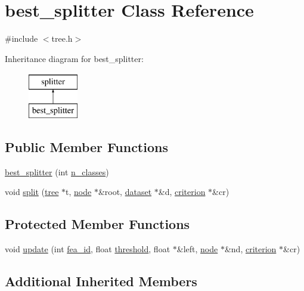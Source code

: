 \hypertarget{classbest__splitter}{\section{best\+\_\+splitter Class Reference}
\label{classbest__splitter}
}


{\ttfamily \#include $<$tree.\+h$>$}

Inheritance diagram for best\+\_\+splitter\+:\begin{figure}[H]
\begin{center}
\leavevmode
\includegraphics[height=2.000000cm]{classbest__splitter}
\end{center}
\end{figure}
\subsection*{Public Member Functions}
\begin{DoxyCompactItemize}
\item 
\hyperlink{classbest__splitter_a40d856f885a1ed21fa840063b8d49164}{best\+\_\+splitter} (int \hyperlink{classsplitter_abfc53538ed65c0afd50aedbf46dff458}{n\+\_\+classes})
\item 
void \hyperlink{classbest__splitter_a1ff1e766bfa4fb6d41c23121d6dd3dbb}{split} (\hyperlink{classtree}{tree} $\ast$t, \hyperlink{classnode}{node} $\ast$\&root, \hyperlink{classdataset}{dataset} $\ast$\&d, \hyperlink{classcriterion}{criterion} $\ast$\&cr)
\end{DoxyCompactItemize}
\subsection*{Protected Member Functions}
\begin{DoxyCompactItemize}
\item 
void \hyperlink{classbest__splitter_a681ad1823db5207f3a5a6acd5c09b354}{update} (int \hyperlink{classsplitter_ad093754efc111ae9dcb00e844b91e979}{fea\+\_\+id}, float \hyperlink{classsplitter_af40121f8411ad94f3f1968b1d50905ed}{threshold}, float $\ast$\&left, \hyperlink{classnode}{node} $\ast$\&nd, \hyperlink{classcriterion}{criterion} $\ast$\&cr)
\end{DoxyCompactItemize}
\subsection*{Additional Inherited Members}


